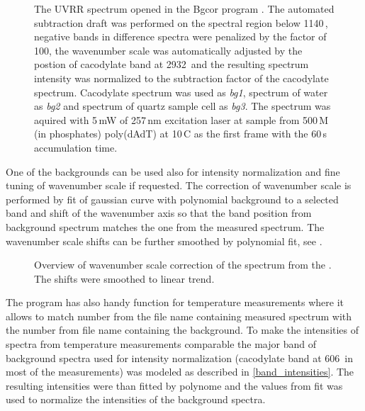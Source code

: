 \begin{figure}
	\centering
	\caption[%
		Bgcor -- program for background correction.
	]{%
		The UVRR spectrum opened in the Bgcor program
		\parencite{Bgcor2017}.
		The automated subtraction draft was performed on the spectral region below
		1140\,\icm{}, negative bands in difference spectra were penalized by the
		factor of 100, the wavenumber scale was automatically adjusted by the
		postion of cacodylate band at 2932\,\icm{} and the resulting spectrum
		intensity was normalized to the subtraction factor of the cacodylate
		spectrum.
		Cacodylate spectrum was used as \emph{bg1}, spectrum of water as \emph{bg2}
		and spectrum of quartz sample cell as \emph{bg3}.
		The spectrum was aquired with 5\,mW of 257\,nm excitation laser at sample
		from 500\,M (in phosphates) poly(dAdT) at 10\,\textdegree{}C as the
		first frame with the 60\,s accumulation time.
	}
	\label{\figlabel{background:bgcor_main}}
\end{figure}

One of the backgrounds can be used also for intensity normalization and
fine tuning of wavenumber scale if requested.
The correction of wavenumber scale is performed by fit of gaussian curve with
polynomial background to a selected band and shift of the wavenumber axis so
that the band position from background spectrum matches the one from the
measured spectrum.
The wavenumber scale shifts can be further smoothed by polynomial fit, see
.

\begin{figure}
	\centering
	\caption[%
		Bgcor -- wavenumber scale correction.
	]{%
		Overview of wavenumber scale correction of the spectrum from the
		.
		The shifts were smoothed to linear trend.
	}
	\label{\figlabel{background:bgcor_xshift}}
\end{figure}

The program has also handy function for temperature measurements where it
allows to match number from the file name containing measured spectrum with
the number from file name containing the background.
To make the intensities of spectra from temperature measurements comparable
the major band of background spectra used for intensity normalization
(cacodylate band at 606\,\icm{} in most of the measurements) was modeled as
described in
\cref{band_intensities}.
The resulting intensities were than fitted by polynome and the values from fit
was used to normalize the intensities of the background spectra.

